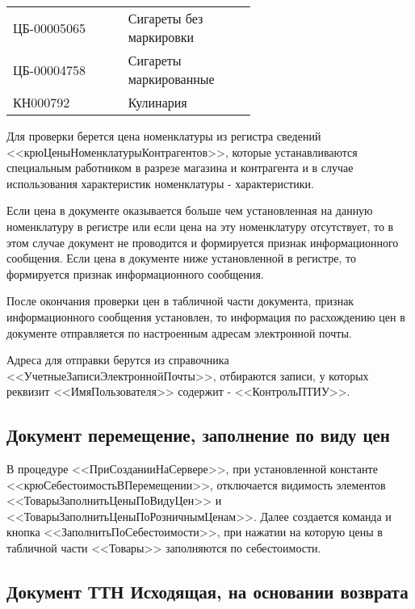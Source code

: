 \vspace{\baselineskip}
\begin{tabular}{p{0.3\linewidth}p{0.3\linewidth}}

	\toprule
	ЦБ-00005065 & Сигареты без маркировки \\
	ЦБ-00004758 & Сигареты маркированные \\

	КН000792 & Кулинария \\
	\bottomrule %
\end{tabular}
\vspace{\baselineskip}\par
Для проверки берется цена номенклатуры из регистра сведений <<крюЦеныНоменклатурыКонтрагентов>>,
которые устанавливаются специальным работником в разрезе магазина и контрагента и в случае использования характеристик номенклатуры - характеристики.\par
Если цена в документе оказывается больше чем установленная на данную номенклатуру в регистре или если цена на эту номенклатуру отсутствует, то в этом случае документ не проводится и формируется признак информационного сообщения. Если цена в документе ниже установленной в регистре, то формируется признак информационного сообщения.\par
После окончания проверки цен в табличной части документа, признак информационного  сообщения установлен, то информация по расхождению цен в документе отправляется по настроенным адресам электронной почты.\par
Адреса для отправки берутся из справочника <<УчетныеЗаписиЭлектроннойПочты>>, отбираются записи, у которых реквизит  <<ИмяПользователя>> содержит - <<КонтрольПТИУ>>.


\subsection{Документ перемещение, заполнение по виду цен}\label{1007}

В процедуре <<ПриСозданииНаСервере>>, при установленной константе <<крюСебестоимостьВПеремещении>>, отключается видимость элементов <<ТоварыЗаполнитьЦеныПоВидуЦен>> и <<ТоварыЗаполнитьЦеныПоРозничнымЦенам>>.
Далее создается команда и кнопка <<ЗаполнитьПоСебестоимости>>, при нажатии на которую цены в табличной части <<Товары>> заполняются по себестоимости.


\subsection{Документ ТТН Исходящая, на основании возврата}\label{1008}

